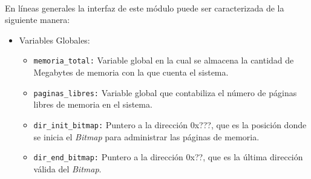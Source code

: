 \documentclass[11pt, a4paper]{article}
\begin{document}
			\paragraph{}
			En líneas generales la interfaz de este módulo puede ser caracterizada de la siguiente manera:
			\begin{itemize}
				\item Variables Globales:
				\begin{itemize}
					\item \texttt{memoria\_total:} Variable global en la cual se almacena la cantidad de Megabytes de memoria con la que cuenta el sistema.
					\item \texttt{paginas\_libres:} Variable global que contabiliza el número de páginas libres de memoria en el sistema.
					\item \texttt{dir\_init\_bitmap:} Puntero a la dirección 0x???, que es la posición donde se inicia el \textit{Bitmap} para administrar las páginas de memoria.
					\item \texttt{dir\_end\_bitmap:} Puntero a la dirección 0x??, que es la última dirección válida del \textit{Bitmap}.
				\end{itemize}
				

\end{itemize}
\end{document}
